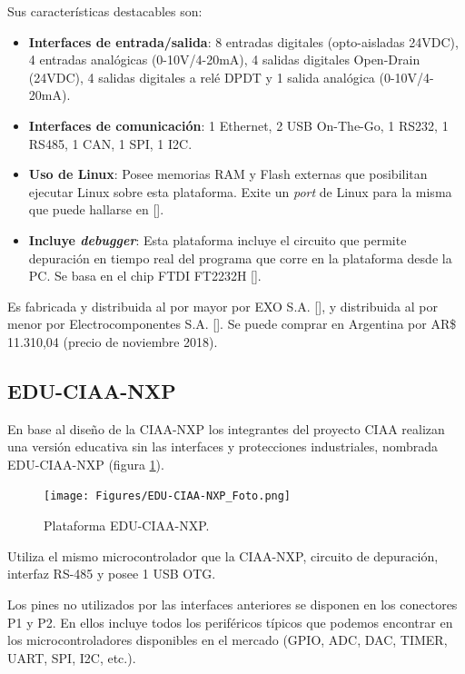 Sus características destacables son:

\begin{itemize}
\item
\textbf{Interfaces de entrada/salida}: 8 entradas digitales (opto-aisladas 24VDC), 4 entradas analógicas (0-10V/4-20mA), 4 salidas digitales Open-Drain (24VDC), 4 salidas digitales a relé DPDT y 1 salida analógica (0-10V/4-20mA).
\item
\textbf{Interfaces de comunicación}: 1 Ethernet, 2 USB On-The-Go, 1 RS232, 1 RS485, 1 CAN, 1 SPI, 1 I2C.
\item
\textbf{Uso de Linux}: Posee memorias RAM y Flash externas que posibilitan ejecutar Linux sobre esta plataforma. Exite un \emph{port} de Linux para la misma que puede hallarse en [].
\item
\textbf{Incluye \emph{debugger}}: Esta plataforma incluye el circuito que permite depuración en tiempo real del programa que corre en la plataforma desde la PC. Se basa en el chip FTDI FT2232H [].
\end{itemize}

Es fabricada y distribuida al por mayor por EXO S.A. [], y distribuida al por menor por Electrocomponentes S.A. []. Se puede comprar en Argentina por AR\$ 11.310,04 (precio de noviembre 2018).

\subsection{EDU-CIAA-NXP}

En base al diseño de la CIAA-NXP los integrantes del proyecto CIAA realizan una versión educativa sin las interfaces y protecciones industriales, nombrada EDU-CIAA-NXP (figura \ref{fig:eduCiaa}).

\begin{figure}[!htbp]
\begin{center}  %
\texttt{[image: Figures/EDU-CIAA-NXP\_Foto.png]}
\par\caption{Plataforma EDU-CIAA-NXP.}\label{fig:eduCiaa}
\end{center}
\end{figure}

Utiliza el mismo microcontrolador que la CIAA-NXP, circuito de depuración, interfaz RS-485 y posee 1 USB OTG.

Los pines no utilizados por las interfaces anteriores se disponen en los conectores P1 y P2. En ellos incluye todos los periféricos típicos que podemos encontrar en los microcontroladores disponibles en el mercado (GPIO, ADC, DAC, TIMER, UART, SPI, I2C, etc.).

